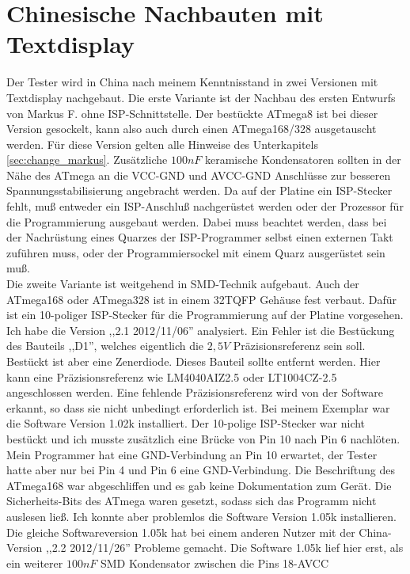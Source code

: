 \section{Chinesische Nachbauten mit Textdisplay}
Der Tester wird in China nach meinem Kenntnisstand in zwei Versionen mit Textdisplay nachgebaut.
Die erste Variante ist der Nachbau des ersten Entwurfs von Markus F. ohne ISP-Schnittstelle.
Der bestückte ATmega8 ist bei dieser Version gesockelt, kann also auch durch einen ATmega168/328 ausgetauscht werden.
Für diese Version gelten alle Hinweise des Unterkapitels \ref{sec:change_markus}.
Zusätzliche \(100nF\) keramische Kondensatoren sollten in der Nähe des ATmega an die VCC-GND und
AVCC-GND Anschlüsse zur besseren Spannungsstabilisierung angebracht werden.
Da auf der Platine ein ISP-Stecker fehlt, muß entweder ein ISP-Anschluß nachgerüstet werden oder
der Prozessor für die Programmierung ausgebaut werden.
Dabei muss beachtet werden, dass bei der Nachrüstung eines Quarzes der ISP-Programmer selbst
einen externen Takt zuführen muss, oder der Programmiersockel mit einem Quarz ausgerüstet sein muß.\\
Die zweite Variante ist weitgehend in SMD-Technik aufgebaut. Auch der ATmega168 oder ATmega328 
ist in einem 32TQFP Gehäuse fest verbaut.
Dafür ist ein 10-poliger ISP-Stecker für die Programmierung auf der Platine vorgesehen.
Ich habe die Version ,,2.1 2012/11/06'' analysiert. Ein Fehler ist die Bestückung des Bauteils ,,D1'',
welches eigentlich die \(2,5V\) Präzisionsreferenz sein soll. Bestückt ist aber eine Zenerdiode.
Dieses Bauteil sollte entfernt werden. Hier kann eine Präzisionsreferenz wie LM4040AIZ2.5 oder
LT1004CZ-2.5 angeschlossen werden. Eine fehlende Präzisionsreferenz wird von der Software erkannt,
so dass sie nicht unbedingt erforderlich ist.
Bei meinem Exemplar war die Software Version 1.02k installiert. Der 10-polige ISP-Stecker war nicht
bestückt und ich musste zusätzlich eine Brücke von Pin 10 nach Pin 6 nachlöten. Mein Programmer hat eine 
GND-Verbindung an Pin 10 erwartet, der Tester hatte aber nur bei Pin 4 und Pin 6 eine GND-Verbindung.
Die Beschriftung des ATmega168 war abgeschliffen und es gab keine Dokumentation zum Gerät.
Die Sicherheits-Bits des ATmega waren gesetzt, sodass sich das Programm nicht auslesen ließ.
Ich konnte aber problemlos die Software Version 1.05k installieren.
Die gleiche Softwareversion 1.05k hat bei einem anderen Nutzer mit der China-Version ,,2.2 2012/11/26'' Probleme
gemacht. Die Software 1.05k lief hier erst, als ein weiterer \(100nF\) SMD Kondensator zwischen die Pins 18-AVCC
